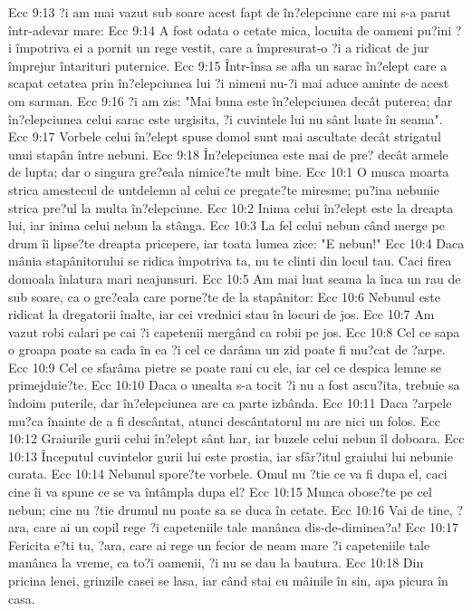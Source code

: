 Ecc 9:13  ?i am mai vazut sub soare acest fapt de în?elepciune care mi s-a parut într-adevar mare:
Ecc 9:14  A fost odata o cetate mica, locuita de oameni pu?ini ?i împotriva ei a pornit un rege vestit, care a împresurat-o ?i a ridicat de jur împrejur întarituri puternice.
Ecc 9:15  Într-însa se afla un sarac în?elept care a scapat cetatea prin în?elepciunea lui ?i nimeni nu-?i mai aduce aminte de acest om sarman.
Ecc 9:16  ?i am zis: "Mai buna este în?elepciunea decât puterea; dar în?elepciunea celui sarac este urgisita, ?i cuvintele lui nu sânt luate în seama".
Ecc 9:17  Vorbele celui în?elept spuse domol sunt mai ascultate decât strigatul unui stapân între nebuni.
Ecc 9:18  În?elepciunea este mai de pre? decât armele de lupta; dar o singura gre?eala nimice?te mult bine.
Ecc 10:1  O musca moarta strica amestecul de untdelemn al celui ce pregate?te miresme; pu?ina nebunie strica pre?ul la multa în?elepciune.
Ecc 10:2  Inima celui în?elept este la dreapta lui, iar inima celui nebun la stânga.
Ecc 10:3  La fel celui nebun când merge pe drum îi lipse?te dreapta pricepere, iar toata lumea zice: "E nebun!"
Ecc 10:4  Daca mânia stapânitorului se ridica împotriva ta, nu te clinti din locul tau. Caci firea domoala înlatura mari neajunsuri.
Ecc 10:5  Am mai luat seama la înca un rau de sub soare, ca o gre?eala care porne?te de la stapânitor:
Ecc 10:6  Nebunul este ridicat la dregatorii înalte, iar cei vrednici stau în locuri de jos.
Ecc 10:7  Am vazut robi calari pe cai ?i capetenii mergând ca robii pe jos.
Ecc 10:8  Cel ce sapa o groapa poate sa cada în ea ?i cel ce darâma un zid poate fi mu?cat de ?arpe.
Ecc 10:9  Cel ce sfarâma pietre se poate rani cu ele, iar cel ce despica lemne se primejduie?te.
Ecc 10:10  Daca o unealta s-a tocit ?i nu a fost ascu?ita, trebuie sa îndoim puterile, dar în?elepciunea are ca parte izbânda.
Ecc 10:11  Daca ?arpele mu?ca înainte de a fi descântat, atunci descântatorul nu are nici un folos.
Ecc 10:12  Graiurile gurii celui în?elept sânt har, iar buzele celui nebun îl doboara.
Ecc 10:13  Începutul cuvintelor gurii lui este prostia, iar sfâr?itul graiului lui nebunie curata.
Ecc 10:14  Nebunul spore?te vorbele. Omul nu ?tie ce va fi dupa el, caci cine îi va spune ce se va întâmpla dupa el?
Ecc 10:15  Munca obose?te pe cel nebun; cine nu ?tie drumul nu poate sa se duca în cetate.
Ecc 10:16  Vai de tine, ?ara, care ai un copil rege ?i capeteniile tale manânca dis-de-diminea?a!
Ecc 10:17  Fericita e?ti tu, ?ara, care ai rege un fecior de neam mare ?i capeteniile tale manânca la vreme, ca to?i oamenii, ?i nu se dau la bautura.
Ecc 10:18  Din pricina lenei, grinzile casei se lasa, iar când stai cu mâinile în sin, apa picura în casa.
